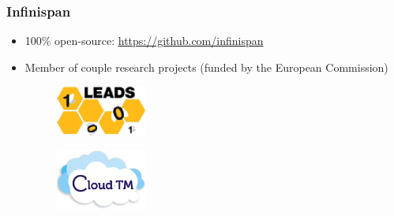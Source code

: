 \documentclass[10pt,utf8]{beamer}
\begin{document}
\begin{frame}
	\frametitle{Infinispan}
	\begin{itemize}
		\item 100\% open-source: \url{https://github.com/infinispan}
		\item Member of couple research projects (funded by the European Commission)
			\begin{figure}
				\centering
				\includegraphics[width=3cm]{./img/leads.eps}
			\end{figure}
			\vspace{0.5cm}
			\begin{figure}
				\centering
				\includegraphics[width=3cm]{./img/cloudTM.eps}
			\end{figure}
	\end{itemize}
\end{frame}
\end{document}
